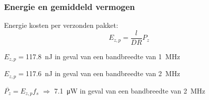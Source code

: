 \begin{frame}
    \frametitle{Energie en gemiddeld vermogen}

    Energie kosten per verzonden pakket:
    \begin{equation*}
        E_{z,p}=\frac{l}{DR}P_z
    \end{equation*}

    \pause

    $E_{z,p}=$\qty{117.8}{\nano\joule} in geval van een bandbreedte van \qty{1}{\mega\hertz}

    $E_{z,p}=$\qty{117.6}{\nano\joule} in geval van een bandbreedte van \qty{2}{\mega\hertz}

    \pause

    \vspace{1cm}
    $\overline{P_z}=E_{z,p}f_s$ $\Rightarrow$ \qty{7.1}{\micro\watt} in geval van een bandbreedte van \qty{2}{\mega\hertz}

\end{frame}